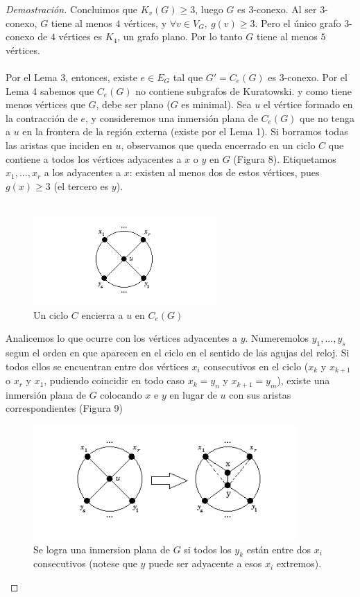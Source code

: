 \documentclass{article}
\begin{document}
\begin{proof}[Demostración]
Concluimos que $K_v(G) \ge 3$, luego $G$ es $3$-conexo. Al ser $3$-conexo, $G$ tiene al menos $4$ vértices, y $\forall v \in V_G, \ g(v) \ge 3 $. Pero el único grafo 3-conexo de $4$ vértices es $K_4$, un grafo plano. Por lo tanto $G$ tiene al menos $5$ vértices.  \\ \\
Por el Lema 3, entonces, existe $e \in E_G$ tal que $G' = C_e(G)$ es 3-conexo. Por el Lema 4 sabemos que $C_e(G)$ no contiene subgrafos de Kuratowski. y como tiene menos vértices que $G$, debe ser plano ($G$ es minimal). Sea $u$ el vértice formado en la contracción de $e$, y consideremos una inmersión plana de $C_e(G)$ que no tenga a $u$ en la frontera de la región externa (existe por el Lema 1). Si borramos todas las aristas que inciden en $u$, observamos que queda encerrado en un ciclo $C$ que contiene a todos los vértices adyacentes a $x$ o $y$ en $G$ (Figura 8). Etiquetamos $x_1, ..., x_r$ a los adyacentes a $x$: existen al menos dos de estos vértices, pues $g(x) \ge 3$ (el tercero es $y$). \\ \\
 \begin{figure}[htp]
\centering
\includegraphics[width=7cm]{img/kura8}
\caption{Un ciclo $C$ encierra a $u$ en $C_e(G)$}
\label{fig:kura1}
\end{figure}

Analicemos lo que ocurre con los vértices adyacentes a $y$. Numeremolos $y_1, ..., y_s$ segun el orden en que aparecen en el ciclo en el sentido de las agujas del reloj. Si todos ellos se encuentran entre dos vértices $x_i$ consecutivos en el ciclo ($x_k$ y $x_{k+1}$ o $x_r$ y $x_1$, pudiendo coincidir en todo caso ${x_k} = y_n$ y $x_{k+1} = y_m$), existe una inmersión plana de $G$ colocando $x$ e $y$ en lugar de $u$ con sus aristas correspondientes (Figura 9)

 \begin{figure}[htp]
\centering
\includegraphics[width=10cm]{img/kura9}
\caption{Se logra una inmersion plana de $G$ si todos los $y_k$ están entre dos $x_i$ consecutivos (notese que $y$ puede ser adyacente a esos $x_i$ extremos).}
\label{fig:kura9}
\end{figure}


\end{proof}
\end{document}
